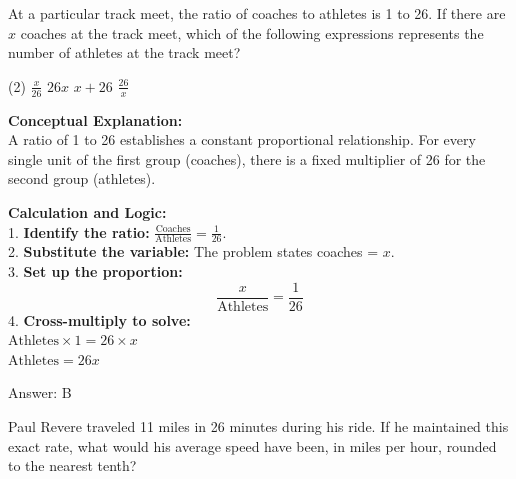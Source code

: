 \documentclass[11pt,paper=a4,answers]{exam}
\begin{document}
\begin{questions}
\pointsinrightmargin
\pointsdroppedatright
\marksnotpoints
{}
\pointformat{\boldmath\themarginpoints}
\bracketedpoints



\question
At a particular track meet, the ratio of coaches to athletes is 1 to 26. If there are $x$ coaches at the track meet, which of the following expressions represents the number of athletes at the track meet?
\begin{tasks}(2)
    \task $\frac{x}{26}$
    \task $26x$
    \task $x + 26$
    \task $\frac{26}{x}$
\end{tasks}

\begin{solution}
\textbf{Conceptual Explanation:} \\
A ratio of 1 to 26 establishes a constant proportional relationship. For every single unit of the first group (coaches), there is a fixed multiplier of 26 for the second group (athletes).

\vspace{30pt}

\textbf{Calculation and Logic:} \\
1. \textbf{Identify the ratio:} $\frac{\text{Coaches}}{\text{Athletes}} = \frac{1}{26}$. \\
2. \textbf{Substitute the variable:} The problem states coaches = $x$. \\
3. \textbf{Set up the proportion:} 
\[ \frac{x}{\text{Athletes}} = \frac{1}{26} \]
4. \textbf{Cross-multiply to solve:} \\
$\text{Athletes} \times 1 = 26 \times x$ \\
$\text{Athletes} = 26x$

\vspace{30pt}

Answer: \colorbox{yellow!100}{B}
\end{solution}

\vspace{60pt}

\question
Paul Revere traveled 11 miles in 26 minutes during his ride. If he maintained this exact rate, what would his average speed have been, in miles per hour, rounded to the nearest tenth?


\end{questions}
\end{document}

